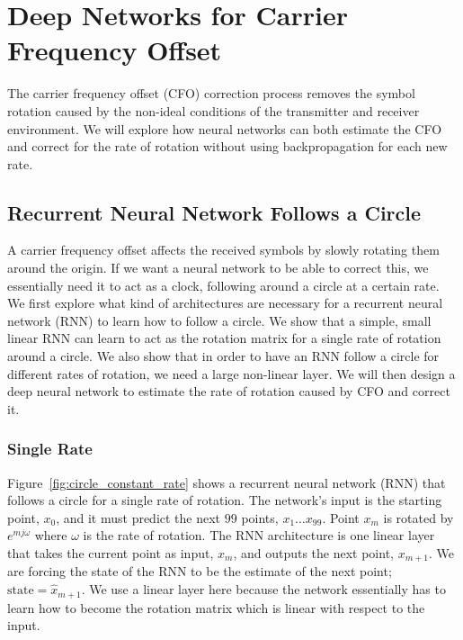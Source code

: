 \chapter[Deep Networks for Carrier Frequency Offset]{Deep Networks for Carrier Frequency Offset\raisebox{.3\baselineskip}{\normalsize\footnotemark}}

The carrier frequency offset (CFO) correction process removes the symbol rotation caused by the non-ideal conditions of the transmitter and receiver environment.  We will explore how neural networks can both estimate the CFO and correct for the rate of rotation without using backpropagation for each new rate.

\section{Recurrent Neural Network Follows a Circle}

A carrier frequency offset affects the received symbols by slowly rotating them around the origin.  If we want a neural network to be able to correct this, we essentially need it to act as a clock, following around a circle at a certain rate.
We first explore what kind of architectures are necessary for a recurrent neural network (RNN) to learn how to follow a circle.
We show that a simple, small linear RNN can learn to act as the rotation matrix for a single rate of rotation around a circle.
We also show that in order to have an RNN follow a circle for different rates of rotation, we need a large non-linear layer.
We will then design a deep neural network to estimate the rate of rotation caused by CFO and correct it.

\subsection{Single Rate}

Figure~\ref{fig:circle_constant_rate} shows a recurrent neural network (RNN) that follows a circle for a single rate of rotation.  The network's input is the starting point, $x_0$, and it must predict the next $99$ points, $x_1 \ldots x_{99}$.  Point $x_m$ is rotated by $e^{mj\omega}$ where $\omega$ is the rate of rotation.  The RNN architecture is one linear layer that takes the current point as input, $x_m$, and outputs the next point, $x_{m+1}$.  We are forcing the state of the RNN to be the estimate of the next point; $\text{state} = \hat{x}_{m+1}$.  We use a linear layer here because the network essentially has to learn how to become the rotation matrix which is linear with respect to the input. 

